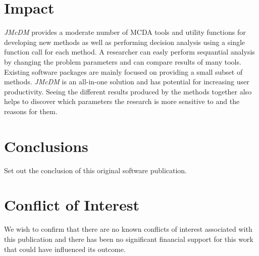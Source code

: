 \documentclass[preprint,review, 12pt, a4paper]{elsarticle}
\begin{document}

\section{Impact}
\label{section:impact}

\emph{JMcDM} provides a moderate number of MCDA tools and utility functions for developing new methods as well as performing
decision analysis using a single function call for each method. A researcher can easly perform sequantial analysis by changing 
the problem parameters and can compare results of many tools. Existing software packages are mainly focused on providing a 
small subset of methods. \emph{JMcDM} is an all-in-one solution and has potential for increasing user productivity. Seeing 
the different results produced by the methods together also helps to discover which parameters the research is more sensitive 
to and the reasons for them.   

\section{Conclusions}
\label{section:conclusion}
{\color{red}Set out the conclusion of this original software publication.}


\section{Conflict of Interest}
We wish to confirm that there are no known conflicts of interest associated with this publication and there has been no significant financial support for this work that could have influenced its outcome.
\end{document}
